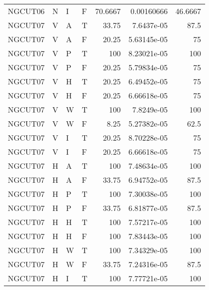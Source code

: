 \begin{longtable}{llllrrr}
    NGCUT06  & N         & I         & F          & 70.6667    & 0.00160666  & 46.6667  \\
    NGCUT07  & V         & A         & T          & 33.75      & 7.6437e-05  & 87.5     \\
    NGCUT07  & V         & A         & F          & 20.25      & 5.63145e-05 & 75       \\
    NGCUT07  & V         & P         & T          & 100        & 8.23021e-05 & 100      \\
    NGCUT07  & V         & P         & F          & 20.25      & 5.79834e-05 & 75       \\
    NGCUT07  & V         & H         & T          & 20.25      & 6.49452e-05 & 75       \\
    NGCUT07  & V         & H         & F          & 20.25      & 6.66618e-05 & 75       \\
    NGCUT07  & V         & W         & T          & 100        & 7.8249e-05  & 100      \\
    NGCUT07  & V         & W         & F          & 8.25       & 5.27382e-05 & 62.5     \\
    NGCUT07  & V         & I         & T          & 20.25      & 8.70228e-05 & 75       \\
    NGCUT07  & V         & I         & F          & 20.25      & 6.66618e-05 & 75       \\
    NGCUT07  & H         & A         & T          & 100        & 7.48634e-05 & 100      \\
    NGCUT07  & H         & A         & F          & 33.75      & 6.94752e-05 & 87.5     \\
    NGCUT07  & H         & P         & T          & 100        & 7.30038e-05 & 100      \\
    NGCUT07  & H         & P         & F          & 33.75      & 6.81877e-05 & 87.5     \\
    NGCUT07  & H         & H         & T          & 100        & 7.57217e-05 & 100      \\
    NGCUT07  & H         & H         & F          & 100        & 7.83443e-05 & 100      \\
    NGCUT07  & H         & W         & T          & 100        & 7.34329e-05 & 100      \\
    NGCUT07  & H         & W         & F          & 33.75      & 7.24316e-05 & 87.5     \\
    NGCUT07  & H         & I         & T          & 100        & 7.77721e-05 & 100      \\

\end{longtable}

